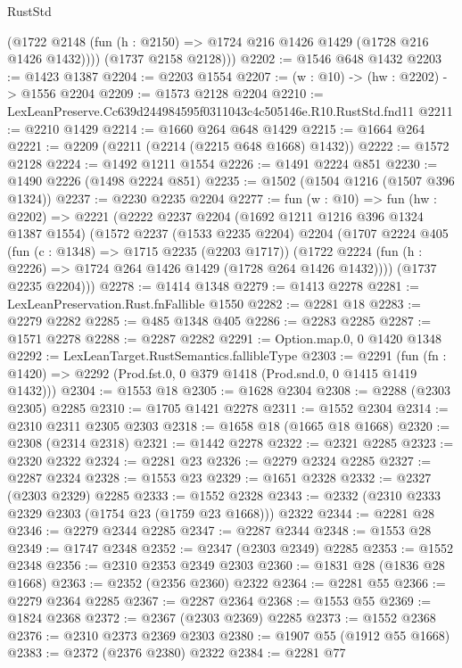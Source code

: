 \begin{lexlean}{RustStd}
\begin{coremodule}
          (@1722 @2148 (fun (h : @2150) => @1724 @216 @1426 @1429 (@1728 @216 @1426 @1432))))
        (@1737 @2158 @2128)))
@2202 := @1546 @648 @1432
@2203 := @1423 @1387
@2204 := @2203 @1554
@2207 := (w : @10) -> (hw : @2202) -> @1556 @2204
@2209 := @1573 @2128 @2204
@2210 := LexLeanPreserve.Cc639d244984595f0311043c4c505146e.R10.RustStd.fnd11
@2211 := @2210 @1429
@2214 := @1660 @264 @648 @1429
@2215 := @1664 @264
@2221 := @2209 (@2211 (@2214 (@2215 @648 @1668) @1432))
@2222 := @1572 @2128
@2224 := @1492 @1211 @1554
@2226 := @1491 @2224 @851
@2230 := @1490 @2226 (@1498 @2224 @851)
@2235 := @1502 (@1504 @1216 (@1507 @396 @1324))
@2237 := @2230 @2235 @2204
@2277 := fun (w : @10) =>
  fun (hw : @2202) =>
  @2221
    (@2222
      @2237
      @2204
      (@1692 @1211 @1216 @396 @1324 @1387 @1554)
      (@1572
        @2237
        (@1533 @2235 @2204)
        @2204
        (@1707
          @2224
          @405
          (fun (c : @1348) => @1715 @2235 (@2203 @1717))
          (@1722 @2224 (fun (h : @2226) => @1724 @264 @1426 @1429 (@1728 @264 @1426 @1432))))
        (@1737 @2235 @2204)))
@2278 := @1414 @1348
@2279 := @1413 @2278
@2281 := LexLeanPreservation.Rust.fnFallible @1550
@2282 := @2281 @18
@2283 := @2279 @2282
@2285 := @485 @1348 @405
@2286 := @2283 @2285
@2287 := @1571 @2278
@2288 := @2287 @2282
@2291 := Option.map.{0, 0} @1420 @1348
@2292 := LexLeanTarget.RustSemantics.fallibleType
@2303 := @2291
    (fun (fn : @1420) => @2292 (Prod.fst.{0, 0} @379 @1418 (Prod.snd.{0, 0} @1415 @1419 @1432)))
@2304 := @1553 @18
@2305 := @1628 @2304
@2308 := @2288 (@2303 @2305) @2285
@2310 := @1705 @1421 @2278
@2311 := @1552 @2304
@2314 := @2310 @2311 @2305 @2303
@2318 := @1658 @18 (@1665 @18 @1668)
@2320 := @2308 (@2314 @2318)
@2321 := @1442 @2278
@2322 := @2321 @2285
@2323 := @2320 @2322
@2324 := @2281 @23
@2326 := @2279 @2324 @2285
@2327 := @2287 @2324
@2328 := @1553 @23
@2329 := @1651 @2328
@2332 := @2327 (@2303 @2329) @2285
@2333 := @1552 @2328
@2343 := @2332 (@2310 @2333 @2329 @2303 (@1754 @23 (@1759 @23 @1668))) @2322
@2344 := @2281 @28
@2346 := @2279 @2344 @2285
@2347 := @2287 @2344
@2348 := @1553 @28
@2349 := @1747 @2348
@2352 := @2347 (@2303 @2349) @2285
@2353 := @1552 @2348
@2356 := @2310 @2353 @2349 @2303
@2360 := @1831 @28 (@1836 @28 @1668)
@2363 := @2352 (@2356 @2360) @2322
@2364 := @2281 @55
@2366 := @2279 @2364 @2285
@2367 := @2287 @2364
@2368 := @1553 @55
@2369 := @1824 @2368
@2372 := @2367 (@2303 @2369) @2285
@2373 := @1552 @2368
@2376 := @2310 @2373 @2369 @2303
@2380 := @1907 @55 (@1912 @55 @1668)
@2383 := @2372 (@2376 @2380) @2322
@2384 := @2281 @77

\end{coremodule}
\end{lexlean}
